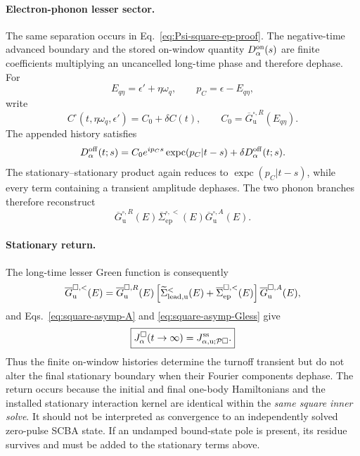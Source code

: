 \documentclass[
 reprint,
 superscriptaddress,
 amsmath,amssymb,
 aps,prb,
 longbibliography,
 floatfix
]{revtex4-2}
\newcommand{\ep}{\mathrm{ep}}
\newcommand{\expc}{\operatorname{expc}}
\newcommand{\barSigma}{\overline{\Sigma}}
\begin{document}
\paragraph{Electron-phonon lesser sector.}
The same separation occurs in Eq.~\eqref{eq:Psi-square-ep-proof}. The negative-time advanced boundary and the stored on-window quantity \(D_\alpha^{\rm on}(s)\) are finite coefficients multiplying an uncancelled long-time phase and therefore dephase. For
\begin{equation*}
E_{q\eta}=\epsilon'+\eta\omega_q,
\qquad
p_C=\epsilon-E_{q\eta},
\end{equation*}
write
\begin{equation*}
C^\square(t,\eta\omega_q,\epsilon')
=C_0+\delta C(t),
\qquad
C_0=\overline G_{\mathrm u}^{\square,R}(E_{q\eta}).
\end{equation*}
The appended history satisfies
\begin{equation*}
D_\alpha^{\rm off}(t;s)
=
C_0e^{ip_Cs}\expc(p_C|t-s)
+
\delta D_\alpha^{\rm off}(t;s).
\end{equation*}
The stationary--stationary product again reduces to \(\expc(p_C|t-s)\), while every term containing a transient amplitude dephases. The two phonon branches therefore reconstruct
\begin{equation*}
\overline G_{\mathrm u}^{\square,R}(E)
\barSigma_{\ep}^{\square,<}(E)
\overline G_{\mathrm u}^{\square,A}(E).
\end{equation*}

\paragraph{Stationary return.}
The long-time lesser Green function is consequently
\begin{equation}
\overline G_{\mathrm u}^{\square,<}(E)
=
\overline G_{\mathrm u}^{\square,R}(E)
\left[
\widetilde\Sigma_{\rm lead,u}^{<}(E)
+
\barSigma_{\ep}^{\square,<}(E)
\right]
\overline G_{\mathrm u}^{\square,A}(E),
\label{eq:square-asymp-Gless}
\end{equation}
and Eqs.~\eqref{eq:square-asymp-A} and \eqref{eq:square-asymp-Gless} give
\begin{equation}
\boxed{
J_\alpha^\square(t\to\infty)
=
J_{\alpha,\mathrm u;\mathcal P\square}^{\rm ss}.
}
\label{eq:square-asymp-current}
\end{equation}
Thus the finite on-window histories determine the turnoff transient but do not alter the final stationary boundary when their Fourier components dephase. The return occurs because the initial and final one-body Hamiltonians and the installed stationary interaction kernel are identical within the \emph{same square inner solve}. It should not be interpreted as convergence to an independently solved zero-pulse SCBA state. If an undamped bound-state pole is present, its residue survives and must be added to the stationary terms above.
\end{document}
